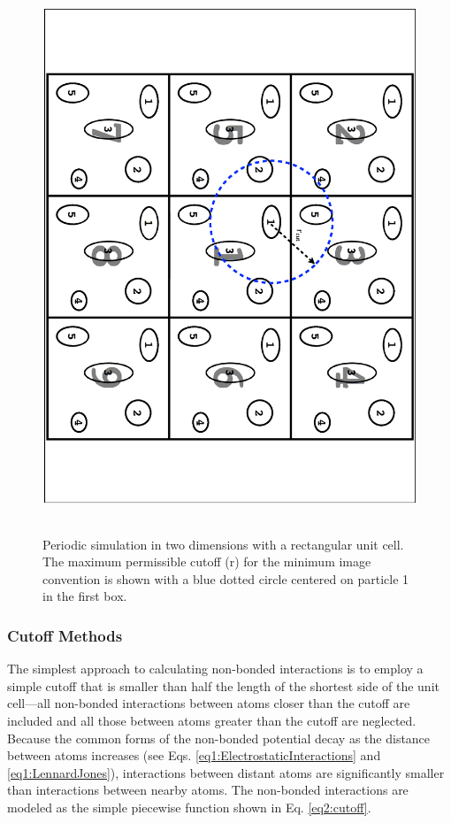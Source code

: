 \begin{figure}
   \includegraphics[height=6.5in, angle=90, trim=0.7cm 3cm 0.7cm 3cm, clip=true]
                   {PBC.ps}
   \caption{Periodic simulation in two dimensions with a rectangular unit cell.
            The maximum permissible cutoff (r) for the minimum image
            convention is shown with a blue dotted circle centered on particle 1
            in the first box.}
   \label{fig2:PBC}
\end{figure}

\subsubsection{Cutoff Methods}

The simplest approach to calculating non-bonded interactions is to employ a
simple cutoff that is smaller than half the length of the shortest side of the
unit cell---\ie all non-bonded interactions between atoms closer than the cutoff
are included and all those between atoms greater than the cutoff are neglected.
Because the common forms of the non-bonded potential decay as the distance
between atoms increases (see Eqs. \ref{eq1:ElectrostaticInteractions} and
\ref{eq1:LennardJones}), interactions between distant atoms are significantly
smaller than interactions between nearby atoms. The non-bonded interactions are
modeled as the simple piecewise function shown in Eq. \ref{eq2:cutoff}.

